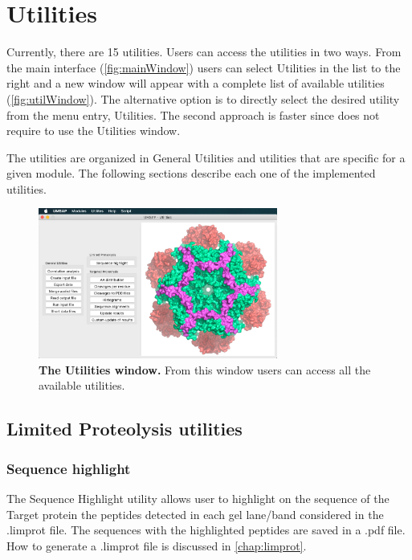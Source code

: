 \chapter{Utilities}
\label{chap:util}

Currently, there are \num{15} utilities. Users can access the utilities in two ways. From the main interface (\autoref{fig:mainWindow}) users can select Utilities in the list to the right and a new window will appear with a complete list of available utilities (\autoref{fig:utilWindow}). The alternative option is to directly select the desired utility from the menu entry, Utilities. The second approach is faster since does not require to use the Utilities window.

The utilities are organized in General Utilities and utilities that are specific for a given module. The following sections describe each one of the implemented utilities.

\begin{figure}[h]
	\centering
	\includegraphics[width=0.7\textwidth]{./IMAGES/UTIL-WINDOW/util.jpg}	    
	\caption[The Utilities window]{\textbf{The Utilities window.} From this window users can access all the available utilities.} 
	\label{fig:utilWindow}
	\vspace{-5pt} 	
\end{figure} 

\section{Limited Proteolysis utilities}

\subsection{Sequence highlight}
\label{subsec:utilSeqHigh}
The Sequence Highlight utility allows user to highlight on the sequence of the Target protein the peptides detected in each gel lane/band considered in the .limprot file. The sequences with the highlighted peptides are saved in a .pdf file. How to generate a .limprot file is discussed in \autoref{chap:limprot}.

